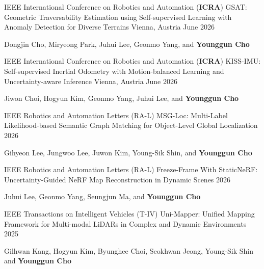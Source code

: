 \begin{cventries}
  \cventry
    {IEEE International Conference on Robotics and Automation (\textbf{ICRA})} %
    {GSAT: Geometric Traversability Estimation using Self-supervised Learning with Anomaly Detection for Diverse Terrains} %
    {Vienna, Austria} %
    {June 2026} %
    {
      \begin{cvitems} %
        \item {Dongjin Cho, Miryeong Park, Juhui Lee, Geonmo Yang, and \textbf{Younggun Cho}}
      \end{cvitems}
    }


  \cventry
    {IEEE International Conference on Robotics and Automation (\textbf{ICRA})} %
    {KISS-IMU: Self-supervised Inertial Odometry with Motion-balanced Learning and Uncertainty-aware Inference} %
    {Vienna, Austria} %
    {June 2026} %
    {
      \begin{cvitems} %
        \item {Jiwon Choi, Hogyun Kim, Geonmo Yang, Juhui Lee, and \textbf{Younggun Cho}}
      \end{cvitems}
    }


  \cventry
    {IEEE Robotics and Automation Letters (RA-L)} %
    {MSG-Loc: Multi-Label Likelihood-based Semantic Graph Matching for Object-Level Global Localization} %
    {} %
    {2026} %
    {
      \begin{cvitems} %
        \item {Gihyeon Lee, Jungwoo Lee, Juwon Kim, Young-Sik Shin, and \textbf{Younggun Cho}}
      \end{cvitems}
    }

  \cventry
    {IEEE Robotics and Automation Letters (RA-L)} %
    {Freeze-Frame With StaticNeRF: Uncertainty-Guided NeRF Map Reconstruction in Dynamic Scenes} %
    {} %
    {2026} %
    {
      \begin{cvitems} %
        \item {Juhui Lee, Geonmo Yang, Seungjun Ma, and \textbf{Younggun Cho}}
      \end{cvitems}
    }

  \cventry
    {IEEE Transactions on Intelligent Vehicles (T-IV)} %
    {Uni-Mapper: Unified Mapping Framework for Multi-modal LiDARs in Complex and Dynamic Environments} %
    {} %
    {2025} %
    {
      \begin{cvitems} %
        \item {Gilhwan Kang, Hogyun Kim, Byunghee Choi, Seokhwan Jeong, Young-Sik Shin and \textbf{Younggun Cho}}
      \end{cvitems}
    }


\end{cventries}
